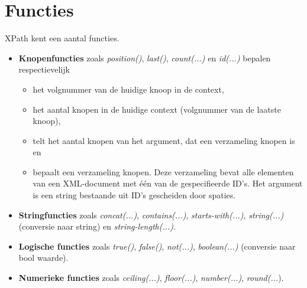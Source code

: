 \documentclass{report}
\begin{document}
	\section{Functies}
	XPath kent een aantal functies.
	\begin{itemize}
		\item \textbf{Knopenfuncties} zoals \textit{position()}, \textit{last()}, \textit{count(...)} en \textit{id(...)} bepalen respectievelijk \begin{itemize}
			\item het volgnummer van de huidige knoop in de context, 
			\item het aantal knopen in de huidige context (volgnummer van de laatste knoop),
			\item telt het aantal knopen van het argument, dat een verzameling knopen is en
			\item bepaalt een verzameling knopen. Deze verzameling bevat alle elementen van een XML-document met één van de gespecifieerde ID's. Het argument is een string bestaande uit ID's gescheiden door spaties.
		\end{itemize}
	
		\item \textbf{Stringfuncties} zoals \textit{concat(...)}, \textit{contains(...)}, \textit{starts-with(...)}, \textit{string(...)} (conversie naar string) en \textit{string-length(...)}.
		
		\item \textbf{Logische functies} zoals \textit{true()}, \textit{false()}, \textit{not(...)}, \textit{boolean(...)} (conversie naar bool waarde).
		
		\item \textbf{Numerieke functies} zoals \textit{ceiling(...)}, \textit{floor(...)}, \textit{number(...)}, \textit{round(...}).
	\end{itemize}
	
\end{document}
